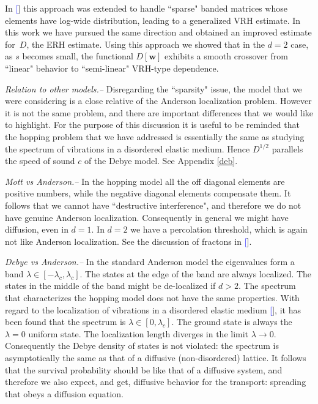 \documentclass[aps,pre,floats,floatfix,twocolumn]{revtex4}
\newcommand{\rmrk}[1]{#1}
\renewcommand{\cite}[1]{\textcolor{blue}{[\onlinecite{#1}}]} %
\begin{document}
In \cite{kbd,kbw,slk} this approach was extended 
to handle ``sparse" banded matrices whose elements have 
log-wide distribution, leading to a generalized VRH estimate. 
In this work we have pursued the same direction and obtained an 
improved estimate for~$D$, the ERH estimate.
Using this approach we showed that in the $d{=}2$ case, 
as $s$ becomes small, the functional $D[\bm{w}]$ exhibits 
a smooth crossover from ``linear" behavior to ``semi-linear" VRH-type dependence.  

\rmrk{{\em Relation to other models.-- }}
Disregarding the ``sparsity" issue, the model that we were considering 
is a close relative of the Anderson localization problem.
However it is not the same problem, and there are important 
differences that we would like to highlight.
For the purpose of this discussion it is useful to be reminded 
that the hopping problem that we have addressed is essentially 
the same as studying the spectrum of vibrations in 
a disordered elastic medium. Hence $D^{1/2}$ parallels the  
speed of sound $c$ of the Debye model. See Appendix \ref{deb}.

\rmrk{{\em Mott vs Anderson.-- }}
In the hopping model all the off diagonal elements are positive numbers, 
while the negative diagonal elements compensate them.
It follows that we cannot have ``destructive interference", 
and therefore we do not have genuine Anderson localization. 
Consequently in general we might have diffusion, even in $d{=}1$. 
%
In $d{=}2$ we have a percolation threshold, which is again 
not like Anderson localization. 
See the discussion of fractons in \cite{havlin}.


\rmrk{{\em Debye vs Anderson.-- }}
In the standard Anderson model the eigenvalues form 
a band ${\lambda \in [-\lambda_c,\lambda_c]}$.
The states at the edge of the band are always localized.
The states in the middle of the band might be de-localized if ${d>2}$.  
%
The spectrum that characterizes the hopping model does
not have the same properties. With regard to the 
localization of vibrations in a disordered elastic medium \cite{loc},  
it has been found that the spectrum is ${\lambda \in [0,\lambda_c]}$.
The ground state is always the ${\lambda=0}$ uniform state.
The localization length diverges in the limit ${\lambda \rightarrow 0}$.
Consequently the Debye density of states is not violated:
the spectrum is asymptotically the same as that of a 
diffusive (non-disordered) lattice. It follows that the 
survival probability should be like that of a diffusive 
system, and therefore we also expect, and get, diffusive behavior
for the transport: spreading that obeys a diffusion equation.
\end{document}
